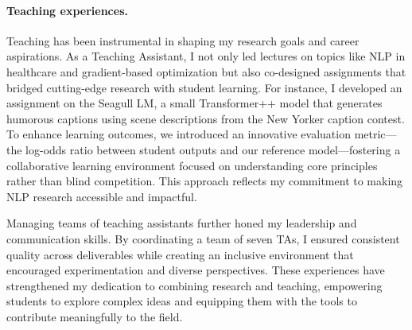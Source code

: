
\paragraph{Teaching experiences.}
% 
Teaching has been instrumental in shaping my research goals and career aspirations.
% 
As a Teaching Assistant, I not only led lectures on topics like NLP in healthcare and gradient-based optimization but also co-designed assignments that bridged cutting-edge research with student learning.
% 
For instance, I developed an assignment on the Seagull LM, a small Transformer++ model that generates humorous captions using scene descriptions from the New Yorker caption contest.
%
To enhance learning outcomes, we introduced an innovative evaluation metric---the log-odds ratio between student outputs and our reference model---fostering a collaborative learning environment focused on understanding core principles rather than blind competition. 
% 
This approach reflects my commitment to making NLP research accessible and impactful.

Managing teams of teaching assistants further honed my leadership and communication skills.
% 
By coordinating a team of seven TAs, I ensured consistent quality across deliverables while creating an inclusive environment that encouraged experimentation and diverse perspectives. 
% 
These experiences have strengthened my dedication to combining research and teaching, empowering students to explore complex ideas and equipping them with the tools to contribute meaningfully to the field.